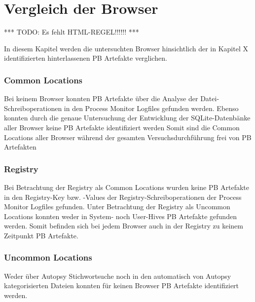 \chapter{Vergleich der Browser}
\label{chapter:vergleich-der-browser}

*** TODO: Es fehlt HTML-REGEL!!!!!! ***

In diesem Kapitel werden die untersuchten Browser hinsichtlich der in Kapitel X identifizierten hinterlassenen PB Artefakte verglichen.

\subsection*{Common Locations}
Bei keinem Browser konnten PB Artefakte über die Analyse der Datei-Schreiboperationen in den Process Monitor Logfiles gefunden werden.
Ebenso konnten durch die genaue Untersuchung der Entwicklung der SQLite-Datenbänke aller Browser keine PB Artefakte identifiziert werden 
Somit sind die Common Locations aller Browser während der gesamten Versuchsdurchführung frei von PB Artefakten

\subsection*{Registry}
Bei Betrachtung der Registry als Common Locations wurden keine PB Artefakte in den Registry-Key bzw. -Values der Registry-Schreiboperationen der Process Monitor Logfiles gefunden.
Unter Betrachtung der Registry als Uncommon Locations konnten weder in System- noch User-Hives PB Artefakte gefunden werden.
Somit befinden sich bei jedem Browser auch in der Registry zu keinem Zeitpunkt PB Artefakte.



\subsection*{Uncommon Locations}
Weder über Autopsy Stichwortsuche noch in den automatisch von Autopsy kategorisierten Dateien konnten für keinen Browser PB Artefakte identifiziert werden.


